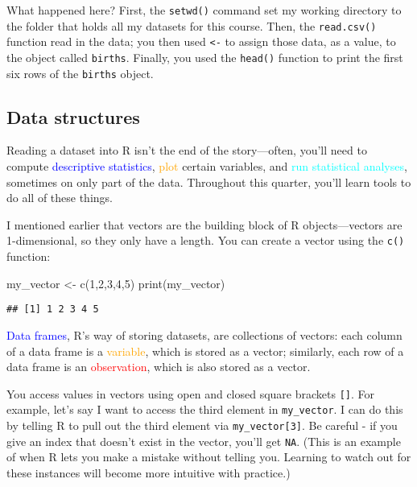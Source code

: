\documentclass[
]{article}
\newenvironment{Shaded}{\begin{snugshade}}{\end{snugshade}}
\newcommand{\DecValTok}[1]{\textcolor[rgb]{0.00,0.00,0.81}{#1}}
\newcommand{\FunctionTok}[1]{\textcolor[rgb]{0.00,0.00,0.00}{#1}}
\newcommand{\NormalTok}[1]{#1}
\newcommand{\OtherTok}[1]{\textcolor[rgb]{0.56,0.35,0.01}{#1}}
\begin{document}
What happened here? First, the \texttt{setwd()} command set my working
directory to the folder that holds all my datasets for this course.
Then, the \texttt{read.csv()} function read in the data; you then used
\texttt{\textless{}-} to assign those data, as a value, to the object
called \texttt{births}. Finally, you used the \texttt{head()} function
to print the first six rows of the \texttt{births} object.

\hypertarget{data-structures}{%
\subsection{Data structures}\label{data-structures}}

Reading a dataset into R isn't the end of the story---often, you'll need
to compute \textcolor{blue}{descriptive statistics},
\textcolor{orange}{plot} certain variables, and
\textcolor{cyan}{run statistical analyses}, sometimes on only part of
the data. Throughout this quarter, you'll learn tools to do all of these
things.

I mentioned earlier that vectors are the building block of R
objects---vectors are 1-dimensional, so they only have a length. You can
create a vector using the \texttt{c()} function:

\begin{Shaded}
\begin{Highlighting}[]
\NormalTok{my\_vector }\OtherTok{\textless{}{-}} \FunctionTok{c}\NormalTok{(}\DecValTok{1}\NormalTok{,}\DecValTok{2}\NormalTok{,}\DecValTok{3}\NormalTok{,}\DecValTok{4}\NormalTok{,}\DecValTok{5}\NormalTok{)}
\FunctionTok{print}\NormalTok{(my\_vector)}
\end{Highlighting}
\end{Shaded}

\begin{verbatim}
## [1] 1 2 3 4 5
\end{verbatim}

\textcolor{blue}{Data frames}, R's way of storing datasets, are
collections of vectors: each column of a data frame is a
\textcolor{orange}{variable}, which is stored as a vector; similarly,
each row of a data frame is an \textcolor{red}{observation}, which is
also stored as a vector.

You access values in vectors using open and closed square brackets
\texttt{{[}{]}}. For example, let's say I want to access the third
element in \texttt{my\_vector}. I can do this by telling R to pull out
the third element via \texttt{my\_vector{[}3{]}}. Be careful - if you
give an index that doesn't exist in the vector, you'll get \texttt{NA}.
(This is an example of when R lets you make a mistake without telling
you. Learning to watch out for these instances will become more
intuitive with practice.)
\end{document}

